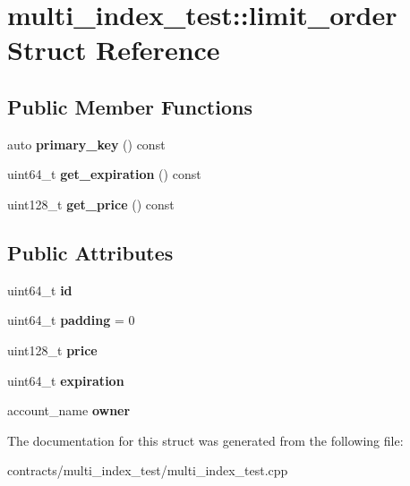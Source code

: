 \hypertarget{structmulti__index__test_1_1limit__order}{}\section{multi\+\_\+index\+\_\+test\+:\+:limit\+\_\+order Struct Reference}
\label{structmulti__index__test_1_1limit__order}
\subsection*{Public Member Functions}
\begin{DoxyCompactItemize}
\item 
\mbox{\label{structmulti__index__test_1_1limit__order_adc5afb7feab55c1cd7b6c5c549d9d132}} 
auto {\bfseries primary\+\_\+key} () const
\item 
\mbox{\label{structmulti__index__test_1_1limit__order_a0bef505db47ec64e7353a25faf866252}} 
uint64\+\_\+t {\bfseries get\+\_\+expiration} () const
\item 
\mbox{\label{structmulti__index__test_1_1limit__order_a79dfbbcbd5a8285b1269d7cda8964d38}} 
uint128\+\_\+t {\bfseries get\+\_\+price} () const
\end{DoxyCompactItemize}
\subsection*{Public Attributes}
\begin{DoxyCompactItemize}
\item 
\mbox{\label{structmulti__index__test_1_1limit__order_a95a9b8647d5fefd3352f3e01e502035e}} 
uint64\+\_\+t {\bfseries id}
\item 
\mbox{\label{structmulti__index__test_1_1limit__order_a7dfea04c12c63eb3683cb3c1610ca502}} 
uint64\+\_\+t {\bfseries padding} = 0
\item 
\mbox{\label{structmulti__index__test_1_1limit__order_aec49edf427478a67979915262cd160a6}} 
uint128\+\_\+t {\bfseries price}
\item 
\mbox{\label{structmulti__index__test_1_1limit__order_aa4696835721fbc824ca7765d1cf89a4a}} 
uint64\+\_\+t {\bfseries expiration}
\item 
\mbox{\label{structmulti__index__test_1_1limit__order_ae89d4be4cb467b23cd51e0925b9add05}} 
account\+\_\+name {\bfseries owner}
\end{DoxyCompactItemize}


The documentation for this struct was generated from the following file\+:\begin{DoxyCompactItemize}
\item 
contracts/multi\+\_\+index\+\_\+test/multi\+\_\+index\+\_\+test.\+cpp\end{DoxyCompactItemize}

